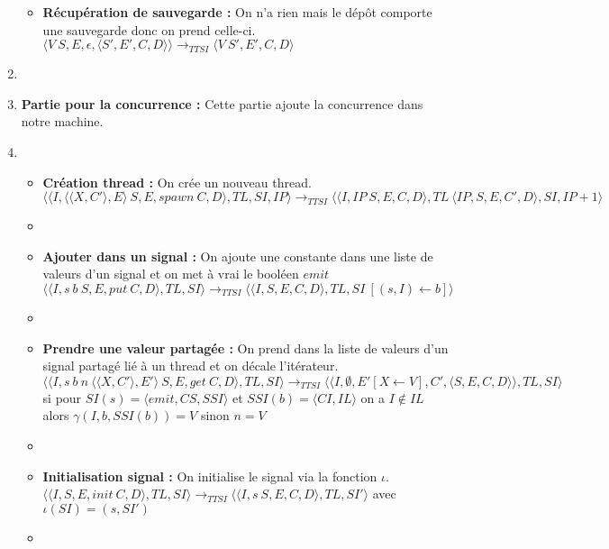 \documentclass[10pt,a4paper]{report}
\begin{document}
\begin{enumerate}
\begin{itemize}
			\item[] \textbf{Récupération de sauvegarde :}  On n'a rien mais le dépôt comporte une sauvegarde donc on prend celle-ci.
			\smallbreak  
			$\langle V~S,E,\epsilon,\langle S',E',C,D\rangle\rangle
			\longrightarrow_{TTSI} 
			\langle V~S',E',C,D\rangle$
		\end{itemize}
		\item[]
		
		
		
		\item[] \textbf{Partie pour la concurrence :} Cette partie ajoute la concurrence dans notre machine. 
		\item[]
		\begin{itemize}
			\item[]  \textbf{Création thread :} On crée un nouveau thread.
			\smallbreak 
			$\langle\langle I,\langle\langle X,C'\rangle, E\rangle~S,E,spawn~C,D\rangle,TL,SI,IP\rangle 
			\longrightarrow_{TTSI} 
			\langle\langle I,IP~S,E,C,D\rangle,TL~\langle IP,S,E,C',D\rangle,SI,IP+1\rangle$
			\item[]
			
			\item[] \textbf{Ajouter dans un signal :} On ajoute une constante dans une liste de valeurs d'un signal et on met à vrai le booléen $emit$
			\smallbreak
			$\langle\langle I,s~b~S,E,put~C,D\rangle,TL,SI\rangle
			\longrightarrow_{TTSI} 
			\langle\langle I,S,E,C,D\rangle,TL,SI~[(s,I) \leftarrow b]\rangle$ 
			\item[]
			
			\item[] \textbf{Prendre une valeur partagée :} On prend dans la liste de valeurs d'un signal partagé lié à un thread et on décale l'itérateur.
			\smallbreak
			$\langle\langle I,s~b~n~\langle\langle X,C'\rangle,E'\rangle~S,E,get~C,D\rangle,TL,SI\rangle 
			\longrightarrow_{TTSI} 
			\langle\langle I,\emptyset,E'[X \leftarrow V],C',\langle S,E,C,D\rangle\rangle,TL,SI\rangle$
			\\ si pour $SI(s) = \langle emit,CS,SSI\rangle$ et $SSI(b) = \langle CI,IL\rangle$ on a $I \notin IL$ alors $\gamma(I,b,SSI(b)) = V$ sinon $n = V$
			\item[]
			
			\item[] \textbf{Initialisation signal :} On initialise le signal via la fonction $\iota$.
			\smallbreak 
			$\langle\langle I,S,E,init~C,D\rangle,TL,SI\rangle 
			\longrightarrow_{TTSI}
			\langle\langle I,s~S,E,C,D\rangle,TL,SI'\rangle$
			avec $\iota(SI) = (s,SI')$
			\item[]	
			

\end{itemize}
\end{enumerate}
\end{document}
